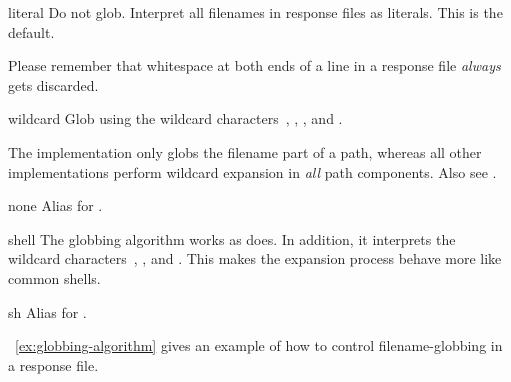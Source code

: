 \begin{table}
  \begin{minipage}{\linewidth}
    \begin{codelist}
    \item[literal]\itemend
      Do not glob.  Interpret all filenames in response files as literals. This is the default.

      Please remember that whitespace at both ends of a line in a response file \emph{always}
      gets discarded.

    \item[wildcard]\itemend
      Glob using the wildcard characters~, \sample{*}, \sample{[}, and \sample{]}.

      The  implementation only globs the filename part of a path, whereas all
      other implementations perform wildcard expansion in \emph{all} path components.  Also see
      .

    \item[none]\itemend
      Alias for .

    \item[shell]\itemend
      The  globbing algorithm works as  does.  In addition, it
      interprets the wildcard characters~\sample{\{}, \sample{\atsign}, and \sample{\squiggle}.
      This makes the expansion process behave more like common 
      shells.

    \item[sh]\itemend
      Alias for .
    \end{codelist}
  \end{minipage}

  \caption[Globbing algorithms]{\label{tab:globbing-algorithms}%
    Globbing algorithms for the use in response files.}
\end{table}

\exampleName~\ref{ex:globbing-algorithm} gives an example of how to control filename-globbing in
a response file.

